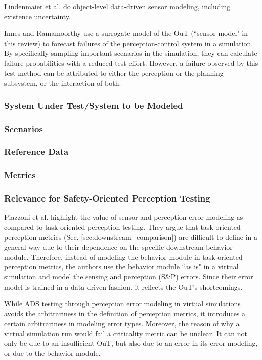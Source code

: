 \documentclass[conference]{IEEEtran}
\begin{document}
Lindenmaier et al. \cite{Lindenmaier2023sensor} do object-level data-driven sensor modeling, including existence uncertainty.

Innes and Ramamoorthy \cite{Innes2022testing} use a surrogate model of the OuT (``sensor model" in this review) to forecast failures of the perception-control system in a simulation. 
By specifically sampling important scenarios in the simulation, they can calculate failure probabilities with a reduced test effort. 
However, a failure observed by this test method can be attributed to either the perception or the planning subsystem, or the interaction of both. 


\subsubsection{System Under Test/System to be Modeled}
\subsubsection{Scenarios}


\subsubsection{Reference Data}
\subsubsection{Metrics}

\subsubsection{Relevance for Safety-Oriented Perception Testing}


\mbox{Piazzoni} et al. \cite{Piazzoni2023simulation} highlight the value of sensor and perception error modeling as compared to task-oriented perception testing. 
They argue that task-oriented perception metrics (Sec. \ref{sec:downstream_comparison}) are difficult to define in a general way due to their dependence on the specific downstream behavior module. 
Therefore, instead of modeling the behavior module in task-oriented perception metrics, the authors use the behavior module ``as is" in a virtual simulation and model the sensing and perception (S\&P) errors. 
Since their error model is trained in a data-driven fashion, it reflects the OuT's shortcomings. 

While ADS testing through perception error modeling in virtual simulations avoids the arbitrariness in the definition of perception metrics, it introduces a certain arbitrariness in modeling error types. 
Moreover, the reason of why a virtual simulation run would fail a criticality metric can be unclear.
It can not only be due to an insufficient OuT, but also due to an error in its error modeling, or due to the behavior module.
\end{document}
